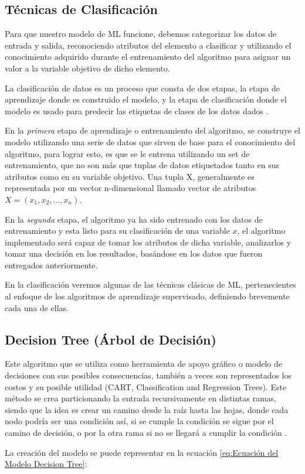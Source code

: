 \doublespacing
\subsection{Técnicas de Clasificación}
Para que nuestro modelo de ML funcione, debemos categorizar los datos de entrada y salida, reconociendo atributos del elemento a clasificar y utilizando el conocimiento adquirido durante el entrenamiento del algoritmo para asignar un valor a la variable objetivo de dicho elemento.\\
\par La clasificación de datos es un proceso que consta de dos etapas, la etapa de aprendizaje donde es construido el modelo, y la etapa de clasificación donde el modelo es usado para predecir las etiquetas de clases de los datos dados \cite{han2012data}.\\
\par En la \textit{primera} etapa de aprendizaje o entrenamiento del algoritmo, se construye el modelo utilizando una serie de datos que sirven de base para el conocimiento del algoritmo, para lograr esto, es que se le entrena utilizando un set de entrenamiento, que no son más que tuplas de datos etiquetados tanto en sus atributos como en su variable objetivo. Una tupla X, generalmente es representada por un vector n-dimensional llamado vector de atributos $ X = (x_{1}, x_{2}, ..., x_{n}) $.\\
\par En la \textit{segunda} etapa, el algoritmo ya ha sido entrenado con los datos de entrenamiento y esta listo para su clasificación de una variable $ x $, el algoritmo implementado
será capaz de tomar los atributos de dicha variable, analizarlos y tomar una decisión en los resultados, basándose en los datos que fueron entregados anteriormente.\\
\par En la clasificación veremos algunas de las técnicas clásicas de ML, pertenecientes al enfoque de los algoritmos de aprendizaje supervisado, definiendo brevemente cada una de ellas.\\


\doublespacing
\subsection{Decision Tree (Árbol de Decisión)}
\label{sec:DT}
Este algoritmo que se utiliza como herramienta de apoyo gráfico o modelo de decisiones con sus posibles consecuencias, también a veces son representados los costos y su posible utilidad (CART, Classification and Regression Trees). Este método se crea particionando la entrada recursivamente en distintas ramas, siendo que la idea es crear un camino desde la raíz hasta las hojas, donde cada nodo podría ser una condición así, si se cumple la condición se sigue por el camino de decisión, o por la otra rama si no se llegará a cumplir la condición \cite{Harrington2012}.\\
\par La creación del modelo se puede representar en la ecuación \ref{eq:Ecuación del Modelo Decision Tree}:\\

